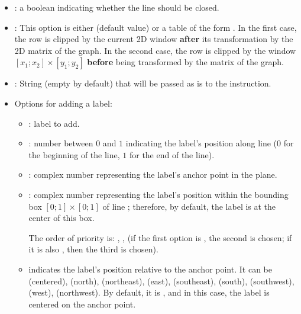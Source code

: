 \begin{itemize}
    \item {}: a boolean indicating whether the line  should be closed.

    \item {}: This option is either \nil (default value) or a table of the form . In the first case, the row is clipped by the current 2D window \textbf{after} its transformation by the 2D matrix of the graph. In the second case, the row is clipped by the window $[x_1;x_2]\times[y_1;y_2]$ \textbf{before} being transformed by the matrix of the graph.

    \item {}: String (empty by default) that will be passed as is to the \drawcmd instruction.
    
    \item Options for adding a label:
    \begin{itemize}
        \item {}: label to add.
        
        \item {}: number between $0$ and $1$ indicating the label's position along line  ($0$ for the beginning of the line, $1$ for the end of the line).
        
        \item {}: complex number representing the label's anchor point in the plane.

    \item {}: complex number representing the label's position within the bounding box $[0;1]\times[0;1]$ of line ; therefore, by default, the label is at the center of this box.

    The order of priority is: , ,  (if the first option is \nil, the second is chosen; if it is also \nil, then the third is chosen).

    \item {} indicates the label's position relative to the anchor point. It can be  (centered),  (north),  (northeast),  (east),  (southeast),  (south),  (southwest),  (west),  (northwest). By default, it is , and in this case, the label is centered on the anchor point.


\end{itemize}
\end{itemize}
